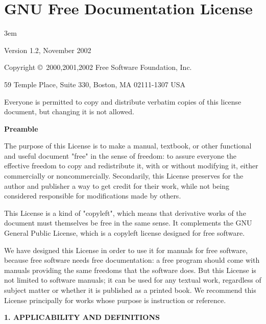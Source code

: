 \chapter{GNU Free Documentation License}\label{label_fdl}

\narrowbaselines
\leftskip 3em
\par

 \begin{center}

       Version 1.2, November 2002


 Copyright \copyright\ 2000,2001,2002  Free Software Foundation, Inc.
 
 \bigskip
 
     59 Temple Place, Suite 330, Boston, MA  02111-1307  USA
  
 \bigskip
 
 Everyone is permitted to copy and distribute verbatim copies
 of this license document, but changing it is not allowed.
\end{center}


\begin{center}
{\bf\large Preamble}
\end{center}

The purpose of this License is to make a manual, textbook, or other
functional and useful document "free" in the sense of freedom: to
assure everyone the effective freedom to copy and redistribute it,
with or without modifying it, either commercially or noncommercially.
Secondarily, this License preserves for the author and publisher a way
to get credit for their work, while not being considered responsible
for modifications made by others.

This License is a kind of "copyleft", which means that derivative
works of the document must themselves be free in the same sense.  It
complements the GNU General Public License, which is a copyleft
license designed for free software.

We have designed this License in order to use it for manuals for free
software, because free software needs free documentation: a free
program should come with manuals providing the same freedoms that the
software does.  But this License is not limited to software manuals;
it can be used for any textual work, regardless of subject matter or
whether it is published as a printed book.  We recommend this License
principally for works whose purpose is instruction or reference.


\begin{center}
{\Large\bf 1. APPLICABILITY AND DEFINITIONS}
\end{center}

